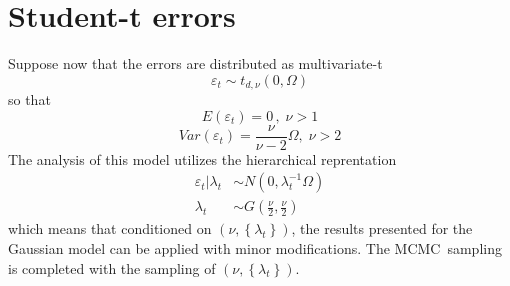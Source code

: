 \documentclass[12pt]{article}
\begin{document}
\section{Student-t errors}

Suppose now that the errors are distributed as multivariate-t%
\begin{equation*}
\varepsilon _{t}\sim t_{d,\nu }\left( 0,\Omega \right)
\end{equation*}%
so that%
\begin{equation*}
E(\varepsilon _{t})=0\,,\;\nu >1
\end{equation*}%
\begin{equation*}
Var\left( \varepsilon _{t}\right) =\frac{\nu }{\nu -2}\Omega ,\;\nu >2
\end{equation*}%
The analysis of this model utilizes the hierarchical reprentation
\begin{align*}
\varepsilon _{t}|\lambda _{t} &\sim N\left( 0,\lambda _{t}^{-1}\Omega \right)
\\
\lambda _{t} &\sim G\left( \frac{\nu }{2},\frac{\nu }{2}\right)
\end{align*}%
which means that conditioned on $\left( \nu ,\left\{ \lambda _{t}\right\}
\right) $, the results presented for the Gaussian model can be applied with
minor modifications. The MCMC\ sampling is completed with the sampling of $%
\left( \nu ,\left\{ \lambda _{t}\right\} \right) $.
\end{document}

